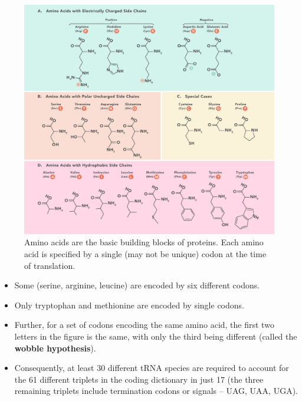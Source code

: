 \documentclass[11pt,ignorenonframetext,aspectratio=169]{beamer}
\providecommand{\tightlist}{%
  \setlength{\itemsep}{0pt}\setlength{\parskip}{0pt}}
\begin{document}
\begin{frame}{}
\protect\hypertarget{section-18}{}
\begin{figure}

{\centering \includegraphics[width=0.58\linewidth]{../images/amino_acids} 

}

\caption{Amino acids are the basic building blocks of proteins. Each amino acid is specified by a single (may not be unique) codon at the time of translation.}\label{fig:amino-acids}
\end{figure}
\end{frame}

\begin{frame}{}
\protect\hypertarget{section-19}{}
\begin{itemize}
\tightlist
\item
  Some (serine, arginine, leucine) are encoded by six different codons.
\item
  Only tryptophan and methionine are encoded by single codons.
\item
  Further, for a set of codons encoding the same amino acid, the first
  two letters in the figure is the same, with only the third being
  different (called the \textbf{wobble hypothesis}).
\item
  Consequently, at least 30 different tRNA species are required to
  account for the 61 different triplets in the coding dictionary in just
  17 (the three remaining triplets include termination codons or signals
  -- UAG, UAA, UGA).
\end{itemize}
\end{frame}
\end{document}
